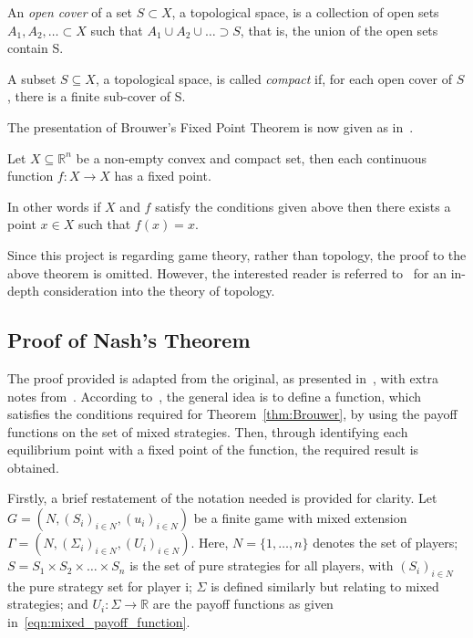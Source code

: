 \begin{definition}
    An \textit{open cover} of a set \(S \subset X\), a topological space, is a
    collection of open sets \(A_{1}, A_{2}, \ldots \subset X\) such that
    \(A_{1} \cup A_{2} \cup \ldots \supset S\), that is, the union of the open
    sets contain S.
\end{definition}\label{def:open_cover}

\begin{definition}
    A subset \(S \subseteq X\), a topological space, is called \textit{compact}
    if, for each open cover of \(S\), there is a finite sub-cover of S.
\end{definition}\label{def:compact}

The presentation of Brouwer's Fixed Point Theorem is now given as 
in~\cite{maschler_solan_zamir_2013}.

\begin{theorem}
    Let \(X \subseteq \mathbb{R}^{n}\) be a non-empty convex and compact
    set, then each continuous function \(f : X \to X\) has a fixed point.  
\end{theorem}\label{thm:Brouwer}

In other words if \(X\) and \(f\) satisfy the conditions given above then there
exists a point \(x \in X\) such that \(f(x) = x\). 

Since this project is regarding game theory, rather than topology, the proof to
the above theorem is omitted. However, the interested reader is referred
to~\cite{Henle1979} for an in-depth consideration into the theory of topology.

\subsection{Proof of Nash's Theorem}\label{subsec:Nash_Proof}
The proof provided is adapted from the original, as presented
in~\cite{nash1951non}, with extra notes from~\cite{maschler_solan_zamir_2013}.
According to~\cite{maschler_solan_zamir_2013}, the general idea is to
define a function, which satisfies the conditions required
for Theorem~\ref{thm:Brouwer}, by using the payoff functions on the set of mixed
strategies. Then, through identifying
each equilibrium point with a fixed point of the function, the required result 
is obtained.

Firstly, a brief restatement of the notation needed is provided for clarity.
Let \(G=(N, {(S_{i})}_{i \in N}, {(u_{i})}_{i \in N})\) be a finite game with
mixed extension \(\Gamma=(N, {(\Sigma_{i})}_{i \in N}, {(U_{i})}_{i \in N})\).
Here, \(N = \{1, \ldots, n\} \) denotes the set of players; \(S = S_{1} \times S_{2} \times
\ldots \times S_{n}\) is the set of pure strategies for all players, with
\({(S_i)}_{i \in N}\) the pure strategy set for player i; \(\Sigma \) is
defined similarly but relating to mixed strategies; and \(U_{i}: \Sigma \to
\mathbb{R}\) are the payoff functions as given in~\eqref{eqn:mixed_payoff_function}.

